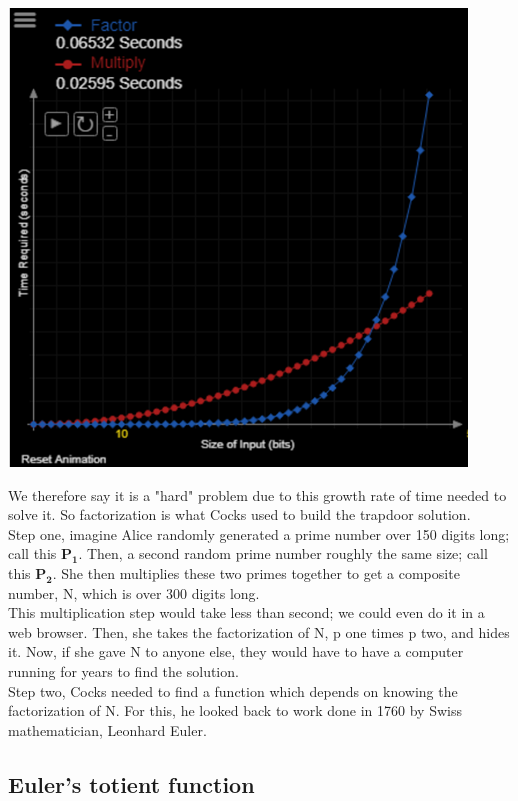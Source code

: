 \documentclass{report}
\begin{document}
\begin{center}
	\includegraphics[scale=0.8]{36.png}
\end{center}
We therefore say it is a "hard" problem due to this growth rate of time needed to solve it. So factorization is what Cocks used to build the trapdoor solution.\\
Step one, imagine Alice randomly generated a prime number over 150 digits long; call this $\mathbf{P_1}$. Then, a second random prime number roughly the same size; call this $\mathbf{P_2}$. She then multiplies these two primes together to get a composite number, N, which is over 300 digits long.\\
This multiplication step would take less than second; we could even do it in a web browser. Then, she takes the factorization of N, p one times p two, and hides it. Now, if she gave N to anyone else, they would have to have a computer running for years to find the solution. \\
Step two, Cocks needed to find a function which depends on knowing the factorization of N. For this, he looked back to work done in 1760 by Swiss mathematician, Leonhard Euler.

\subsection{Euler's totient function}
\end{document}
